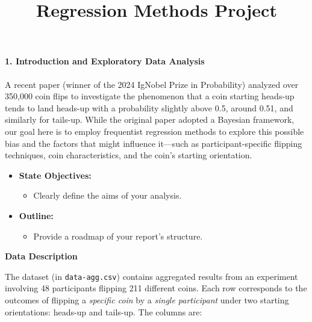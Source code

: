 \documentclass[
  letterpaper,
  DIV=11,
  numbers=noendperiod]{scrartcl}
\title{Regression Methods Project}
\author{}
\date{}
\let\oldparagraph\paragraph
\renewcommand{\paragraph}[1]{\oldparagraph{#1}\mbox{}}
\providecommand{\tightlist}{%
  \setlength{\itemsep}{0pt}\setlength{\parskip}{0pt}}\usepackage{longtable,booktabs,array}
\begin{document}
\maketitle
\ifdefined\Shaded\renewenvironment{Shaded}{\begin{tcolorbox}[interior hidden, borderline west={3pt}{0pt}{shadecolor}, breakable, boxrule=0pt, frame hidden, enhanced, sharp corners]}{\end{tcolorbox}}\fi

\hypertarget{introduction-and-exploratory-data-analysis}{%
\paragraph{\texorpdfstring{\textbf{1. Introduction and Exploratory Data
Analysis}}{1. Introduction and Exploratory Data Analysis}}\label{introduction-and-exploratory-data-analysis}}

A recent paper (winner of the 2024 IgNobel Prize in Probability)
analyzed over 350,000 coin flips to investigate the phenomenon that a
coin starting heads-up tends to land heads-up with a probability
slightly above 0.5, around 0.51, and similarly for tails-up. While the
original paper adopted a Bayesian framework, our goal here is to employ
frequentist regression methods to explore this possible bias and the
factors that might influence it---such as participant-specific flipping
techniques, coin characteristics, and the coin's starting orientation.

\begin{itemize}
\item
  \textbf{State Objectives:}

  \begin{itemize}
  \tightlist
  \item
    Clearly define the aims of your analysis.
  \end{itemize}
\item
  \textbf{Outline:}

  \begin{itemize}
  \tightlist
  \item
    Provide a roadmap of your report's structure.
  \end{itemize}
\end{itemize}

\textbf{Data Description}

The dataset (in \texttt{data-agg.csv}) contains aggregated results from
an experiment involving 48 participants flipping 211 different coins.
Each row corresponds to the outcomes of flipping a \emph{specific coin}
by a \emph{single participant} under two starting orientations: heads-up
and tails-up. The columns are:
\end{document}
